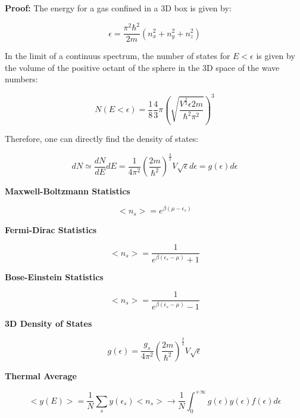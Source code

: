 \documentclass{article}
\begin{document}
\textbf{Proof:}
The energy for a gas confined in a 3D box is given by:

\begin{equation}
    \epsilon=\frac{\pi^2\hbar^2}{2m}(n_x^2+n_y^2+n_z^2)
\end{equation}

In the limit of a continuus spectrum, the number of states for $E<\epsilon$ is given by the volume of the
positive octant of the sphere in the 3D space of the wave numbers:

\begin{equation}
    N(E<\epsilon)= \frac{1}{8} \frac{4}{3}\pi \left(\sqrt{\frac{V^\frac{2}{3} \epsilon 2m}{\hbar^2\pi^2}}\right)^3
\end{equation}

Therefore, one can directly find the density of states:

\begin{equation}
    dN\simeq\frac{dN}{dE}dE=\frac{1}{4\pi^2}\left(\frac{2m}{\hbar^2}\right)^{\frac{3}{2}}V\sqrt{\epsilon}d\epsilon=g(\epsilon)d\epsilon
\end{equation}

\newpage
\begin{tcolorbox}[colframe=gray!90, colback=gray!5, coltitle=white, sharp corners, title=\textbf{Quantum Statistical Mechanics, Summary}, fonttitle=\large\bfseries]
    \textbf{Maxwell-Boltzmann Statistics}

    \begin{equation}
        <n_s>=e^{\beta(\mu-\epsilon_s)}
    \end{equation}

    \textbf{Fermi-Dirac Statistics}

    \begin{equation}
        <n_s>=\frac{1}{e^{\beta(\epsilon_s-\mu)}+1}
    \end{equation}

    \textbf{Bose-Einstein Statistics}

    \begin{equation}
        <n_s>=\frac{1}{e^{\beta(\epsilon_s-\mu)}-1}
    \end{equation}

    \textbf{3D Density of States}

    \begin{equation}
        g(\epsilon)=\frac{g_s}{4\pi^2}\left( \frac{2m}{\hbar^2} \right)^{\frac{3}{2}}V\sqrt{\epsilon}
    \end{equation}

    \textbf{Thermal Average}

    \begin{equation}
        <y(E)>=\frac{1}{N}\sum_{s}y(\epsilon_s)<n_s>\rightarrow \frac{1}{N}\int_0^{+\infty}g(\epsilon)y(\epsilon)f(\epsilon)d\epsilon
    \end{equation}
\end{tcolorbox}
\newpage
\end{document}
